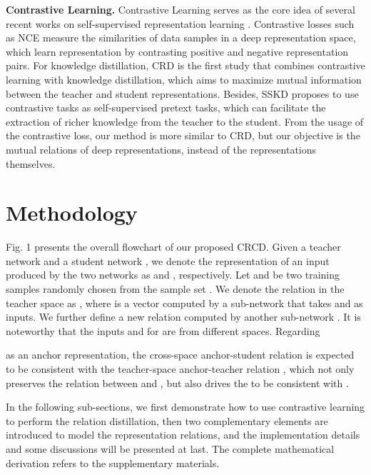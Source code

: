 \documentclass[final]{cvpr}
\begin{document}
\noindent \textbf{Contrastive Learning.}
Contrastive Learning serves as the core idea of several recent works on self-supervised representation learning \cite{SimCLR, moco, CPC, DeepInfoMAx,byol,wang2020understanding,tian2020makes,ge2020selfpaced}.
Contrastive losses such as NCE \cite{infoNCE,DeepInfoMAx} measure the similarities of data samples in a deep representation space, which learn representation by contrasting positive and negative representation pairs.
For knowledge distillation, CRD \cite{crd} is the first study that combines contrastive learning with  knowledge distillation, which aims to maximize mutual information \cite{mine} between the teacher and student representations.
Besides, SSKD \cite{SSKD} proposes to use contrastive tasks as self-supervised pretext tasks, which can facilitate the extraction of richer knowledge from the teacher to the student.
From the usage of the contrastive loss, our method is more similar to CRD, but our objective is the mutual relations of deep representations, instead of the representations themselves. 


\section{Methodology}


Fig. 1 presents the overall flowchart of our proposed CRCD.
Given a teacher network  and a student network , we denote the representation of an input  produced by the two networks as  and , respectively.  
Let  and  be two training samples randomly chosen from  the sample set .
We denote the relation in the teacher space as , where  is a vector computed by a sub-network  that takes  and  as inputs. 
We further define a new relation  computed by another sub-network . It is noteworthy that the inputs   and  for  are from different spaces. 
Regarding 
 
as an anchor representation, the cross-space  anchor-student relation  is expected to be consistent with the teacher-space anchor-teacher relation , which not only preserves the relation between  and , but also drives the  to be consistent with . 

In the following sub-sections, we first demonstrate how to use contrastive learning to perform the relation distillation, then  two complementary elements are introduced to model the representation relations, and the implementation details and some discussions will be presented at last. The complete mathematical derivation refers to the supplementary materials. 
\end{document}
